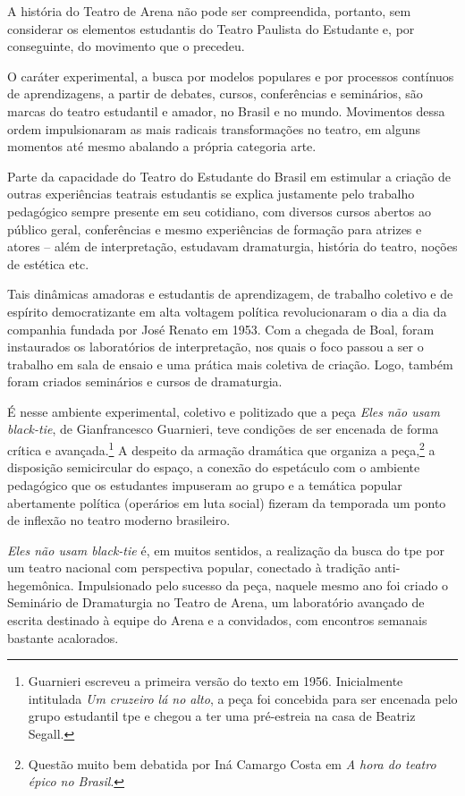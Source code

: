 \subject{Efervescência política e cultural dos anos 1960}

A história do Teatro de Arena não pode ser compreendida, portanto, sem
considerar os elementos estudantis do Teatro Paulista do Estudante e,
por conseguinte, do movimento que o precedeu.

O caráter experimental, a busca por modelos populares e por processos
contínuos de aprendizagens, a partir de debates, cursos, conferências e
seminários, são marcas do teatro estudantil e amador, no Brasil e no
mundo. Movimentos dessa ordem impulsionaram as mais radicais
transformações no teatro, em alguns momentos até mesmo abalando a
própria categoria arte.

Parte da capacidade do Teatro do Estudante do Brasil em estimular a
criação de outras experiências teatrais estudantis se explica justamente
pelo trabalho pedagógico sempre presente em seu cotidiano, com diversos
cursos abertos ao público geral, conferências e mesmo experiências de
formação para atrizes e atores -- além de interpretação, estudavam
dramaturgia, história do teatro, noções de estética etc.

Tais dinâmicas amadoras e estudantis de aprendizagem, de trabalho coletivo e de
espírito democratizante em alta voltagem política revolucionaram o
dia a dia da companhia fundada por José Renato em 1953. Com a chegada de
Boal, foram instaurados os laboratórios de interpretação, nos quais o foco
passou a ser o trabalho em sala de ensaio e uma prática mais coletiva de
criação. Logo, também foram criados seminários e cursos de dramaturgia.

É nesse ambiente experimental, coletivo e politizado que a peça
{\it Eles não usam black-tie}, de Gianfrancesco Guarnieri, teve
condições de ser encenada de forma crítica e avançada.\footnote{Guarnieri
  escreveu a primeira versão do texto em 1956. Inicialmente intitulada {\it Um
  cruzeiro lá no alto}, a peça foi concebida para ser encenada pelo
  grupo estudantil {\sc tpe} e chegou a ter uma pré-estreia na casa de Beatriz
  Segall.} A despeito da armação dramática que organiza a
peça,\footnote{Questão muito bem debatida por Iná Camargo Costa em {\it A
  hora do teatro épico no Brasil}.} a
disposição semicircular do espaço, a conexão do espetáculo com o
ambiente pedagógico que os estudantes impuseram ao grupo e a temática
popular abertamente política (operários em luta social) fizeram da
temporada um ponto de inflexão no teatro moderno brasileiro.

{\it Eles não usam black-tie} é, em muitos sentidos, a realização da
busca do {\sc tpe} por um teatro nacional com perspectiva popular, conectado à
tradição anti-hegemônica. Impulsionado pelo sucesso da peça, naquele
mesmo ano foi criado o Seminário de Dramaturgia no Teatro de Arena, um
laboratório avançado de escrita destinado à equipe do Arena e a
convidados, com encontros semanais bastante acalorados.

